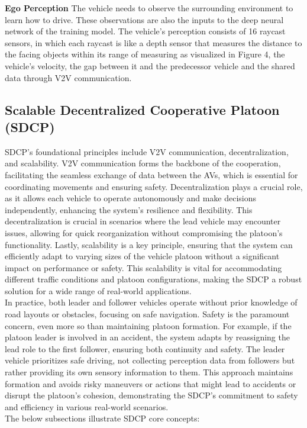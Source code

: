 \textbf{Ego Perception}
The vehicle needs to observe the surrounding environment to learn how to drive. These observations are also the inputs to the deep neural network of the training model. The vehicle's perception consists of 16 raycast sensors, in which each raycast is like a depth sensor that measures the distance to the facing objects within its range of measuring as visualized in Figure 4, the vehicle's velocity, the gap between it and the predecessor vehicle and the shared data through V2V communication.

\subsection{Scalable Decentralized Cooperative Platoon (SDCP)}
SDCP's foundational principles include V2V communication, decentralization, and scalability. V2V communication forms the backbone of the cooperation, facilitating the seamless exchange of data between the AVs, which is essential for coordinating movements and ensuring safety. Decentralization plays a crucial role, as it allows each vehicle to operate autonomously and make decisions independently, enhancing the system's resilience and flexibility. This decentralization is crucial in scenarios where the lead vehicle may encounter issues, allowing for quick reorganization without compromising the platoon's functionality. Lastly, scalability is a key principle, ensuring that the system can efficiently adapt to varying sizes of the vehicle platoon without a significant impact on performance or safety. This scalability is vital for accommodating different traffic conditions and platoon configurations, making the SDCP a robust solution for a wide range of real-world applications.\\
In practice, both leader and follower vehicles operate without prior knowledge of road layouts or obstacles, focusing on safe navigation. Safety is the paramount concern, even more so than maintaining platoon formation. For example, if the platoon leader is involved in an accident, the system adapts by reassigning the lead role to the first follower, ensuring both continuity and safety. The leader vehicle prioritizes safe driving, not collecting perception data from followers but rather providing its own sensory information to them. This approach maintains formation and avoids risky maneuvers or actions that might lead to accidents or disrupt the platoon's cohesion, demonstrating the SDCP's commitment to safety and efficiency in various real-world scenarios.\\
The below subsections illustrate SDCP core concepts:\\


